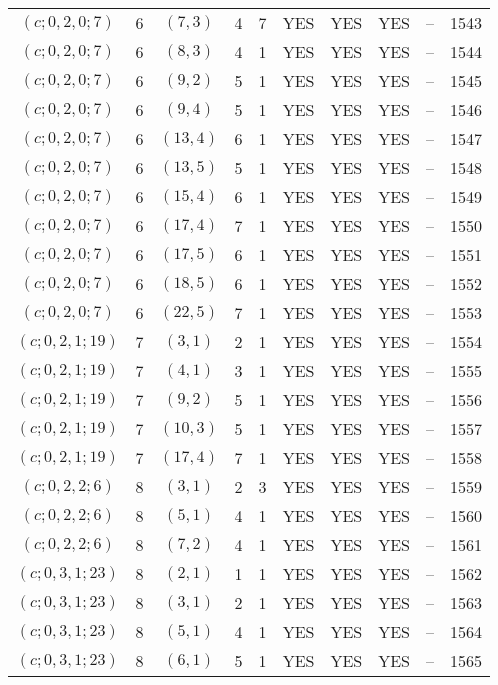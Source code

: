 \begin{longtable}{|c|c|c|c|c|c|c|c|c|c|}
$(c; 0, 2, 0; 7)$ & 6 & $(7, 3)$ & 4 & 7 & YES & YES & YES & -- & 1543\\
$(c; 0, 2, 0; 7)$ & 6 & $(8, 3)$ & 4 & 1 & YES & YES & YES & -- & 1544\\
$(c; 0, 2, 0; 7)$ & 6 & $(9, 2)$ & 5 & 1 & YES & YES & YES & -- & 1545\\
$(c; 0, 2, 0; 7)$ & 6 & $(9, 4)$ & 5 & 1 & YES & YES & YES & -- & 1546\\
$(c; 0, 2, 0; 7)$ & 6 & $(13, 4)$ & 6 & 1 & YES & YES & YES & -- & 1547\\
$(c; 0, 2, 0; 7)$ & 6 & $(13, 5)$ & 5 & 1 & YES & YES & YES & -- & 1548\\
$(c; 0, 2, 0; 7)$ & 6 & $(15, 4)$ & 6 & 1 & YES & YES & YES & -- & 1549\\
$(c; 0, 2, 0; 7)$ & 6 & $(17, 4)$ & 7 & 1 & YES & YES & YES & -- & 1550\\
$(c; 0, 2, 0; 7)$ & 6 & $(17, 5)$ & 6 & 1 & YES & YES & YES & -- & 1551\\
$(c; 0, 2, 0; 7)$ & 6 & $(18, 5)$ & 6 & 1 & YES & YES & YES & -- & 1552\\
$(c; 0, 2, 0; 7)$ & 6 & $(22, 5)$ & 7 & 1 & YES & YES & YES & -- & 1553\\
$(c; 0, 2, 1; 19)$ & 7 & $(3, 1)$ & 2 & 1 & YES & YES & YES & -- & 1554\\
$(c; 0, 2, 1; 19)$ & 7 & $(4, 1)$ & 3 & 1 & YES & YES & YES & -- & 1555\\
$(c; 0, 2, 1; 19)$ & 7 & $(9, 2)$ & 5 & 1 & YES & YES & YES & -- & 1556\\
$(c; 0, 2, 1; 19)$ & 7 & $(10, 3)$ & 5 & 1 & YES & YES & YES & -- & 1557\\
$(c; 0, 2, 1; 19)$ & 7 & $(17, 4)$ & 7 & 1 & YES & YES & YES & -- & 1558\\
$(c; 0, 2, 2; 6)$ & 8 & $(3, 1)$ & 2 & 3 & YES & YES & YES & -- & 1559\\
$(c; 0, 2, 2; 6)$ & 8 & $(5, 1)$ & 4 & 1 & YES & YES & YES & -- & 1560\\
$(c; 0, 2, 2; 6)$ & 8 & $(7, 2)$ & 4 & 1 & YES & YES & YES & -- & 1561\\
$(c; 0, 3, 1; 23)$ & 8 & $(2, 1)$ & 1 & 1 & YES & YES & YES & -- & 1562\\
$(c; 0, 3, 1; 23)$ & 8 & $(3, 1)$ & 2 & 1 & YES & YES & YES & -- & 1563\\
$(c; 0, 3, 1; 23)$ & 8 & $(5, 1)$ & 4 & 1 & YES & YES & YES & -- & 1564\\
$(c; 0, 3, 1; 23)$ & 8 & $(6, 1)$ & 5 & 1 & YES & YES & YES & -- & 1565\\

\end{longtable}
